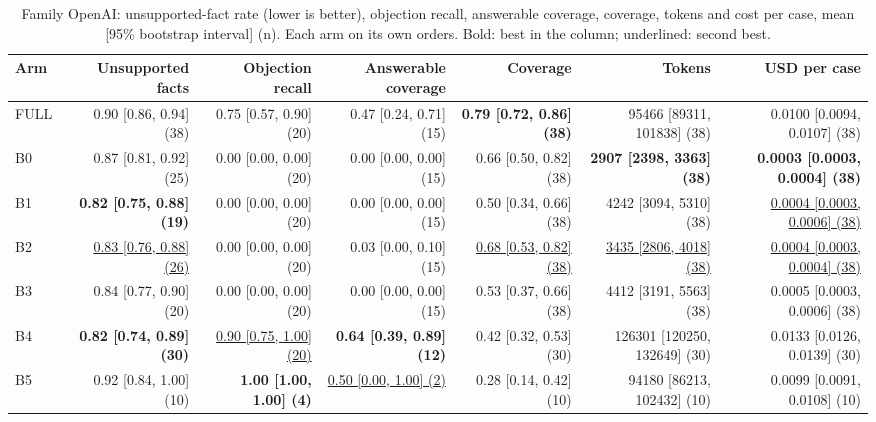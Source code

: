 \begin{table}[htbp]
\centering\footnotesize
\begin{adjustbox}{max width=\textwidth}
\begin{tabular}{@{}lrrrrrr@{}}
\toprule
Arm & Unsupported facts & Objection recall & Answerable coverage & Coverage & Tokens & USD per case \\
\midrule
FULL & 0.90 [0.86, 0.94] (38) & 0.75 [0.57, 0.90] (20) & 0.47 [0.24, 0.71] (15) & \textbf{0.79 [0.72, 0.86] (38)} & 95466 [89311, 101838] (38) & 0.0100 [0.0094, 0.0107] (38) \\
B0 & 0.87 [0.81, 0.92] (25) & 0.00 [0.00, 0.00] (20) & 0.00 [0.00, 0.00] (15) & 0.66 [0.50, 0.82] (38) & \textbf{2907 [2398, 3363] (38)} & \textbf{0.0003 [0.0003, 0.0004] (38)} \\
B1 & \textbf{0.82 [0.75, 0.88] (19)} & 0.00 [0.00, 0.00] (20) & 0.00 [0.00, 0.00] (15) & 0.50 [0.34, 0.66] (38) & 4242 [3094, 5310] (38) & \underline{0.0004 [0.0003, 0.0006] (38)} \\
B2 & \underline{0.83 [0.76, 0.88] (26)} & 0.00 [0.00, 0.00] (20) & 0.03 [0.00, 0.10] (15) & \underline{0.68 [0.53, 0.82] (38)} & \underline{3435 [2806, 4018] (38)} & \underline{0.0004 [0.0003, 0.0004] (38)} \\
B3 & 0.84 [0.77, 0.90] (20) & 0.00 [0.00, 0.00] (20) & 0.00 [0.00, 0.00] (15) & 0.53 [0.37, 0.66] (38) & 4412 [3191, 5563] (38) & 0.0005 [0.0003, 0.0006] (38) \\
B4 & \textbf{0.82 [0.74, 0.89] (30)} & \underline{0.90 [0.75, 1.00] (20)} & \textbf{0.64 [0.39, 0.89] (12)} & 0.42 [0.32, 0.53] (30) & 126301 [120250, 132649] (30) & 0.0133 [0.0126, 0.0139] (30) \\
B5 & 0.92 [0.84, 1.00] (10) & \textbf{1.00 [1.00, 1.00] (4)} & \underline{0.50 [0.00, 1.00] (2)} & 0.28 [0.14, 0.42] (10) & 94180 [86213, 102432] (10) & 0.0099 [0.0091, 0.0108] (10) \\
\bottomrule
\end{tabular}
\end{adjustbox}
\caption{Family OpenAI: unsupported-fact rate (lower is better), objection recall, answerable coverage, coverage, tokens and cost per case, mean [95\% bootstrap interval] (n). Each arm on its own orders. Bold: best in the column; underlined: second best.}
\label{tab:table1b_openai}
\end{table}